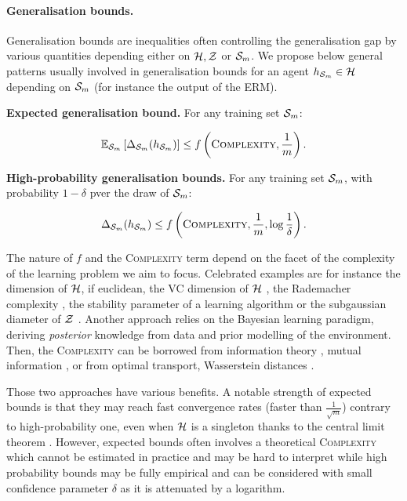 \paragraph{Generalisation bounds.} Generalisation bounds are inequalities often controlling the generalisation gap by various quantities depending either on $\H,\Z$ or $\S_m$. We propose below general patterns usually involved in generalisation bounds for an agent $h_{\Sm}\in\H$ depending on $\S_m$ (for instance the output of the ERM). 

\textbf{Expected generalisation bound.} For any training set $\S_m$:

\[ \mathbb{E}_{\S_m}\LB \Delta_{\Sm}(h_{\Sm}) \RB \leq f\LP \textsc{Complexity}, \frac{1}{m}\RP. \]

\textbf{High-probability generalisation bounds.} For any training set $\S_m$, with probability $1-\delta$ pver the draw of $\Sm$:

\[  \Delta_{\Sm}(h_{\Sm}) \leq f\LP \textsc{Complexity}, \frac{1}{m}, \log\frac{1}{\delta}\RP. \]

The nature of $f$ and the \textsc{Complexity} term depend on the facet of the complexity of the learning problem we aim to focus. Celebrated examples are for instance the dimension of $\H$, if euclidean, the VC dimension of $\H$ \citep{vapnik2000learning}, the Rademacher complexity \citep{bartlett2001rademacher,bartlett2002rademacher},  the stability parameter of a learning algorithm \citep{bousquet2000algo} or the subgaussian diameter of $\Z$ \citep{kontorovich2014conc}. 
Another approach relies on the Bayesian learning paradigm, deriving \emph{posterior} knowledge from data and prior modelling of the environment. 
Then, the \textsc{Complexity} can be borrowed from information theory \citep{cover2001elements}, \eg mutual information \citep{neal2012bayesian}, or from optimal transport, \eg Wasserstein distances \citep{wang2019information,rodriguez2021tighter}. 

Those two approaches have various benefits. A notable strength of expected bounds is that they may reach fast convergence rates (\ie faster than $\frac{1}{\sqrt{m}}$) contrary to high-probability one, even when $\H$ is a singleton thanks to the central limit theorem \citep{grunwald2021mac}. However, expected bounds often involves a theoretical \textsc{Complexity} which cannot be estimated in practice and may be hard to interpret while high probability bounds may be fully empirical and can be considered with small confidence parameter $\delta$ as it is attenuated by a logarithm.

